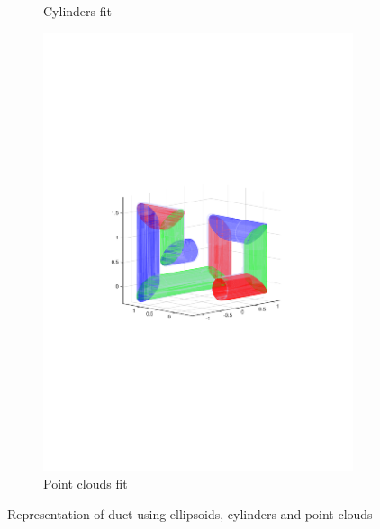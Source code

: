 \documentclass[12pt,a4]{article}
\begin{document}
\begin{figure}[ht!]
\begin{subfigure}{0.325\textwidth}
        \caption{Cylinders fit \label{fig:pipefitcyl}}
    \end{subfigure}
        \begin{subfigure}{0.325\textwidth}
        \centering
        \includegraphics[width=0.75\linewidth]{figures/pipefitstl.pdf}
        \caption{Point clouds fit\label{fig:pipefitstl}}
    \end{subfigure}
    \caption{ Representation of duct using ellipsoids, cylinders and point clouds\label{fig:pipefitECS}}
\end{figure}
\end{document}
